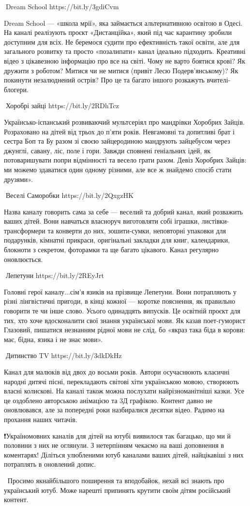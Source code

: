 🦉Dream School https://bit.ly/3gdiCvm

Dream School — «школа мрії», яка займається альтернативною освітою в Одесі. На каналі реалізують проєкт «Дистанційка», який під час карантину зробили доступним для всіх. Не беремося судити про ефективність такої освіти, але для загального розвитку та просто «позалипати» канал ідеально підходить. Креативні відео з цікавезною інформацію про все на світі. Чому не варто боятися крові? Як дружити з роботом? Митися чи не митися (привіт Лесю Подерв’янському)? Як покинути незалюднений острів? Про це та багато іншого розкажуть вчителі-блогери.

🦉Хоробрі зайці https://bit.ly/2RDhTcz 

Українсько-іспанський розвиваючий мультсеріял про мандрівки Хоробрих Зайців. Розраховано на дітей від трьох до п’яти років. Невгамовні та допитливі брат і сестра Боп та Бу разом зі своєю зайцеродиною мандрують зайцебусом через джунглі, савану, ліс, поле і гори. Завжди сповнені геніальних ідей, як потоваришувати попри відмінності та весело грати разом. Девіз Хоробрих Зайців: ми можемо здаватися один одному різними, але все ж знайдемо спосіб стати друзями».

🦉Веселі Саморобки https://bit.ly/2QxgzHK 

Назва каналу говорить сама за себе — веселий та добрий канал, який розважить ваших дітей. Вони навчаться власноруч виготовляти собі іграшки, листівки-трансформери та конверти до них, зошити-сумки, неповторні упаковки для подарунків, кімнатні прикраси, оригінальні закладки для книг, календарики, блокноти з секретом, фоторамки та ще багато цікавого. Канал регулярно оновлюється.

🦉Лепетуни https://bit.ly/2REyJrt

Головні герої каналу...сім’я язиків на прізвище Лепетуни. Вони потрапляють у різні лінгвістичні пригоди, в кінці кожної — коротке пояснення, як правильно говорити те чи інше слово. Усього одинадцять випусків. Це освітній проєкт для тих, хто хоче вдосконалити свої знання української мови. Як казав поет-гуморист Глазовий, пишатися незнанням рідної мови не слід, бо «якраз така біда в корови: має, бідна, язика і не знає мови».

🦉Дитинство TV https://bit.ly/3dkDkHz

Канал для малюків від двох до восьми років. Автори осучаснюють класичні народні дитячі пісні, перекладають світові хіти українською мовою, створюють власні колискові. На каналі також можна послухати найрізноманітніші казки. Усе це оздоблено авторською анімацією та 3Д графікою. Контент давно не оновлювався, але за попередні роки назбиралися десятки відео. Радимо на прохання наших читачів.

❗️Україномовних каналів для дітей на ютубі виявилося так багацько, що ми й половини з них не оглянули. З нетерпінням чекаємо на ваші доповнення в коментарях! Діліться улюбленими ютуб каналами ваших дітей, найцікавіші з них потраплять в оновлений допис.

💛💙Просимо якнайбільшого поширення та вподобайок, нехай всі знають про український ютуб. Може нарешті припинять крутити своїм дітям російський контент.

